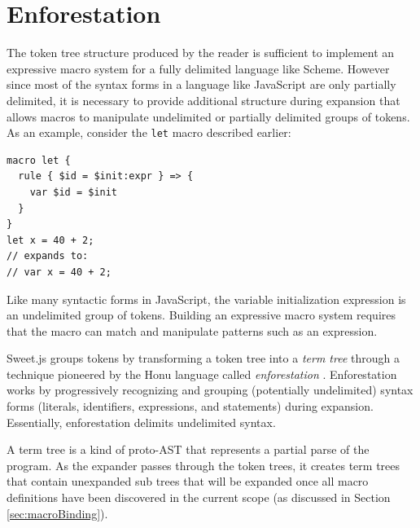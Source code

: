 \documentclass[9pt]{sigplanconf}
\begin{document}
\section{Enforestation}
\label{sec:enforest}

The token tree structure produced by the reader is sufficient to
implement an expressive macro system for a fully delimited language
like Scheme. However since most of the syntax forms in a language like
JavaScript are only partially delimited, it is necessary to provide
additional structure during expansion that allows macros to manipulate
undelimited or partially delimited groups of tokens. As an example,
consider the \verb!let! macro described earlier:

\begin{lstlisting}
macro let {
  rule { $id = $init:expr } => {
    var $id = $init
  }
}
let x = 40 + 2;
// expands to:
// var x = 40 + 2;
\end{lstlisting}

Like many syntactic forms in JavaScript, the variable initialization
expression is an undelimited group of tokens. Building an expressive
macro system requires that the macro can match and manipulate patterns
such as an expression.

Sweet.js groups tokens by transforming a token tree into a \emph{term
  tree} through a technique pioneered by the Honu language called
\emph{enforestation} \cite{Rafkind2013}. Enforestation works by
progressively recognizing and grouping (potentially undelimited)
syntax forms (\eg literals, identifiers, expressions, and statements)
during expansion. Essentially, enforestation delimits undelimited
syntax.

A term tree is a kind of proto-AST that represents a partial parse of
the program. As the expander passes through the token trees, it
creates term trees that contain unexpanded sub trees that will be
expanded once all macro definitions have been discovered in the
current scope (as discussed in Section \ref{sec:macroBinding}).
\end{document}
